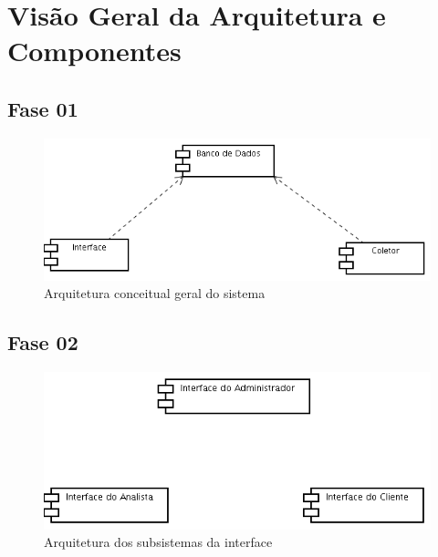 \section{Visão Geral da Arquitetura e Componentes}


\subsection{Fase 01}

\begin{figure}[hb]
    \begin{center}
        \includegraphics[scale=0.5]{img/conceitual}
        \caption{Arquitetura conceitual geral do sistema}
        \label{fig:arquitetura-conceitual}
    \end{center}
\end{figure}

\subsection{Fase 02}

\begin{figure}[hb]
    \begin{center}
        \includegraphics[scale=0.5]{img/interface}
        \caption{Arquitetura dos subsistemas da interface}
        \label{fig:arquitetura-interface}
    \end{center}
\end{figure}

